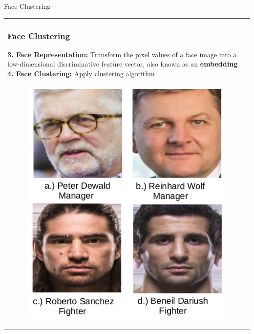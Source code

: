 \documentclass[11pt]{beamer}
\begin{document}
\begin{frame}{Face Clustering}
\begin{tabular}{l}
\parbox{1\linewidth}{
\frametitle{Face Clustering}
\bigskip
\textbf{3. Face Representation:} Transform the pixel values of a face image into a low-dimensional discriminative feature vector, also known as an \textbf{embedding} \\
\textbf{4. Face Clustering:} Apply clustering algorithm
\begin{figure}[!tbp]
  \centering
  \begin{minipage}[b]{0.4\textwidth}
    \includegraphics[width=\textwidth]{figures/plot2.png}
  \end{minipage}
\end{figure}
}
\end{tabular}  
\end{frame}
\end{document}

